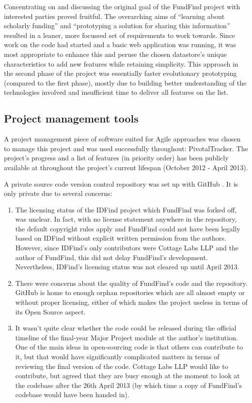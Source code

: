 Concentrating on and discussing the original goal of the FundFind project with interested parties proved fruitful. The overarching aims of ``learning about scholarly funding'' and ``prototyping a solution for sharing this information'' resulted in a leaner, more focussed set of requirements to work towards. Since work on the code had started and a basic web application was running, it was most appropriate to enhance this and peruse the chosen datastore's unique characteristics to add new features while retaining simplicity. This approach in the second phase of the project was essentially faster evolutionary prototyping (compared to the first phase), mostly due to building better understanding of the technologies involved and insufficient time to deliver all features on the list.

\subsection{Project management tools}
\label{pm-tools}
A project management piece of software suited for Agile approaches was chosen to manage this project and was used successfully throughout: PivotalTracker. The project's progress and a list of features (in priority order) has been publicly available at \cite{pm} throughout the project's current lifespan (October 2012 - April 2013).

A private source code version control repository was set up with GitHub \cite{github}. It is only private due to several concerns:
\begin{enumerate}
 \item The licensing status of the IDFind project which FundFind was forked off, was unclear. In fact, with no license statement anywhere in the repository, the default copyright rules apply and FundFind could not have been legally based on IDFind without explicit written permission from the authors. However, since IDFind's only contributors were Cottage Labs LLP and the author of FundFind, this did not delay FundFind's development. Nevertheless, IDFind's licensing status was not cleared up until April 2013.
 
 \item There were concerns about the quality of FundFind's code and the repository. GitHub is home to enough orphan repositories which are all almost empty or without proper licensing, either of which makes the project useless in terms of its Open Source aspect.
 
 \item It wasn't quite clear whether the code could be released during the official timeline of the final-year Major Project module at the author's institution. One of the main ideas in open-sourcing code is that others can contribute to it, but that would have significantly complicated matters in terms of reviewing the final version of the code. Cottage Labs LLP would like to contribute, but agreed that they are busy enough at the moment to look at the codebase after the 26th April 2013 (by which time a copy of FundFind's codebase would have been handed in).
\end{enumerate}

